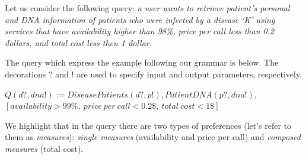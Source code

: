 Let us consider the following query: \textit{a user wants to retrieve patient's personal and DNA information of patients who were infected by a disease `K' using services that have availability higher than 98\%, price per call less than 0.2 dollars, and total cost less then 1 dollar.} 


The query which express the example following our grammar is below.
The decorations ? and ! are used to specify input and output parameters, respectively. 
\begin{small}
\begin{center}
$Q (d?, dna!) := DiseasePatients(d?, p!), PatientDNA(p?, dna!),$ \\
$[availability > 99\%, \ price \ per \ call < 0.2\$, \ total \ cost < 1\$]$
\end{center} 
\end{small}

We highlight that in the query there are two types of preferences (let's refer
to them as \textit{measures}): \textit{single measures} (availability and price
per call) and \textit{composed measures} (total cost).

  

